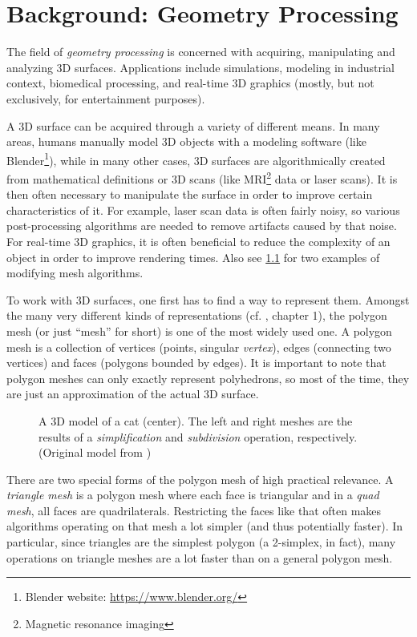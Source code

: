 \chapter{Background: Geometry Processing}

The field of \emph{geometry processing} is concerned with acquiring, manipulating and analyzing 3D surfaces.
Applications include simulations, modeling in industrial context, biomedical processing, and real-time 3D graphics (mostly, but not exclusively, for entertainment purposes).

A 3D surface can be acquired through a variety of different means.
In many areas, humans manually model 3D objects with a modeling software (like Blender\footnote{Blender website: \url{https://www.blender.org/}}), while in many other cases, 3D surfaces are algorithmically created from mathematical definitions or 3D scans (like MRI\footnote{Magnetic resonance imaging} data or laser scans).
It is then often necessary to manipulate the surface in order to improve certain characteristics of it.
For example, laser scan data is often fairly noisy, so various post-processing algorithms are needed to remove artifacts caused by that noise.
For real-time 3D graphics, it is often beneficial to reduce the complexity of an object in order to improve rendering times.
Also see \ref{fig:cat-algo} for two examples of modifying mesh algorithms.

To work with 3D surfaces, one first has to find a way to represent them.
Amongst the many very different kinds of representations (cf. \cite{botsch2010polygon}, chapter 1), the polygon mesh (or just \enquote{mesh} for short) is one of the most widely used one.
A polygon mesh is a collection of vertices (points, singular \emph{vertex}), edges (connecting two vertices) and faces (polygons bounded by edges).
It is important to note that polygon meshes can only exactly represent polyhedrons, so most of the time, they are just an approximation of the actual 3D surface.

\begin{figure}[b]
  
  \caption{A 3D model of a cat (center).
  The left and right meshes are the results of a \emph{simplification} and \emph{subdivision} operation, respectively.
  (Original model from \cite{catmodel})}
  \label{fig:cat-algo}
\end{figure}

There are two special forms of the polygon mesh of high practical relevance.
A \emph{triangle mesh} is a polygon mesh where each face is triangular and in a \emph{quad mesh}, all faces are quadrilaterals.
Restricting the faces like that often makes algorithms operating on that mesh a lot simpler (and thus potentially faster).
In particular, since triangles are the simplest polygon (a 2-simplex, in fact), many operations on triangle meshes are a lot faster than on a general polygon mesh.

